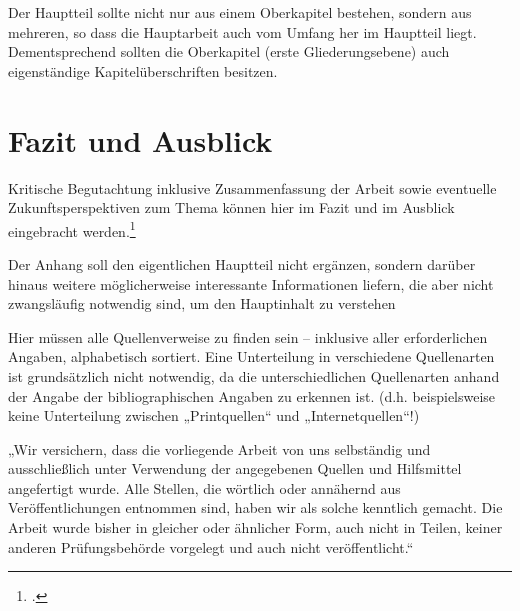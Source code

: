 \documentclass[12pt,toc=bib,toc=listof]{scrreprt}
\newcounter{savepage}
\begin{document}
Der Hauptteil sollte nicht nur aus einem Oberkapitel bestehen, sondern aus mehreren, so dass die Hauptarbeit auch vom Umfang her im Hauptteil liegt. Dementsprechend sollten die Oberkapitel (erste Gliederungsebene) auch eigenständige Kapitelüberschriften besitzen.


\chapter{Fazit und Ausblick} %
\label{sec:fazit}

Kritische Begutachtung inklusive Zusammenfassung der Arbeit sowie eventuelle Zukunftsperspektiven zum Thema können hier im Fazit und im Ausblick eingebracht werden.\footcite [Vgl.] [] {HAN2016S30}


\appendix
\newpage

\setcounter{page}{\thesavepage}

\label{sec:anhang}

Der Anhang soll den eigentlichen Hauptteil nicht ergänzen, sondern darüber hinaus weitere möglicherweise interessante Informationen liefern, die aber nicht zwangsläufig notwendig sind, um den Hauptinhalt zu verstehen

\newpage

\printbibliography[heading=head]

\vspace{2cm}

Hier müssen alle Quellenverweise zu finden sein – inklusive aller erforderlichen Angaben, alphabetisch sortiert. Eine Unterteilung in verschiedene Quellenarten ist grundsätzlich nicht notwendig, da die unterschiedlichen Quellenarten anhand der Angabe der bibliographischen Angaben zu erkennen ist. (d.h. beispielsweise keine Unterteilung zwischen „Printquellen“ und „Internetquellen“!)

\newpage

\label{sec:erklaerung}

„Wir versichern, dass die vorliegende Arbeit von uns selbständig und ausschließlich unter Verwendung der angegebenen Quellen und Hilfsmittel angefertigt wurde. Alle Stellen, die wörtlich oder annähernd aus Veröffentlichungen entnommen sind, haben wir als solche kenntlich gemacht. Die Arbeit wurde bisher in gleicher oder ähnlicher Form, auch nicht in Teilen, keiner anderen Prüfungsbehörde vorgelegt und auch nicht veröffentlicht.“
\end{document}

